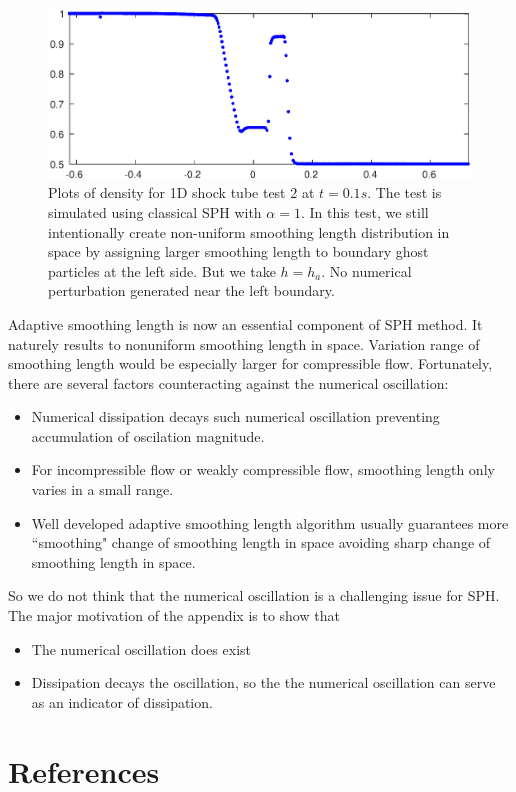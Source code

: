 \documentclass[review]{elsarticle}
\begin{document}
\begin{figure}[H]
\centering
\includegraphics[width=0.90 \textwidth]{App-Figure/Perturbation-ME0-tp1}
\caption{Plots of density for 1D shock tube test 2 at $t=0.1s$. The test is simulated using classical SPH with $\alpha = 1$. In this test, we still intentionally create non-uniform smoothing length distribution in space by assigning larger smoothing length to boundary ghost particles at the left side. But we take $h=h_a$. No numerical perturbation generated near the left boundary.}    
\label{fig:Perturbation-ME0-tp1}
\end{figure}

Adaptive smoothing length is now an essential component of SPH method. It naturely results to nonuniform smoothing length in space. Variation range of smoothing length would be especially larger for compressible flow. Fortunately, there are several factors counteracting against the numerical oscillation:
\begin{itemize}
\item Numerical dissipation decays such numerical oscillation preventing accumulation of oscilation magnitude.
\item For incompressible flow or weakly compressible flow, smoothing length only varies in a small range.
\item Well developed adaptive smoothing length algorithm usually guarantees more ``smoothing" change of smoothing length in space avoiding sharp change of smoothing length in space.
\end{itemize}
So we do not think that the numerical oscillation is a challenging issue for SPH. The major motivation of the appendix is to show that 
\begin{itemize}
\item The numerical oscillation does exist
\item Dissipation decays the oscillation, so the the numerical oscillation can serve as an indicator of dissipation.
\end{itemize}
\section*{References}


\end{document}
